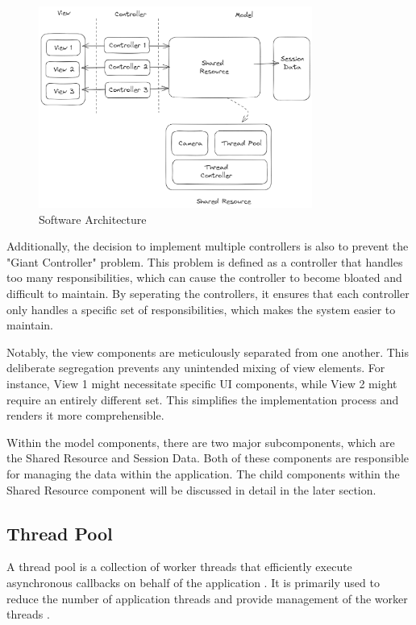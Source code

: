 \begin{figure}[!ht]
    \centering
    \includegraphics[width=0.8\textwidth]{texs/Part2/chapter3/image/architecture.png}
    \caption{Software Architecture}
    \label{fig:architechture}
\end{figure}

Additionally, the decision to implement multiple controllers is also to prevent the "Giant Controller" problem. This problem is defined as a controller that handles too many responsibilities, which can cause the controller to become bloated and difficult to maintain. By seperating the controllers, it ensures that each controller only handles a specific set of responsibilities, which makes the system easier to maintain.

Notably, the view components are meticulously separated from one another. This deliberate segregation prevents any unintended mixing of view elements. For instance, View 1 might necessitate specific UI components, while View 2 might require an entirely different set. This simplifies the implementation process and renders it more comprehensible.

Within the model components, there are two major subcomponents, which are the Shared Resource and Session Data. Both of these components are responsible for managing the data within the application. The child components within the Shared Resource component will be discussed in detail in the later section.

\subsection{Thread Pool}
\label{subsec:thread-pool}

A thread pool is a collection of worker threads that efficiently execute asynchronous callbacks on behalf of the application \cite{Karl-Bridge-Microsoft}. It is primarily used to reduce the number of application threads and provide management of the worker threads \cite{Karl-Bridge-Microsoft}.


